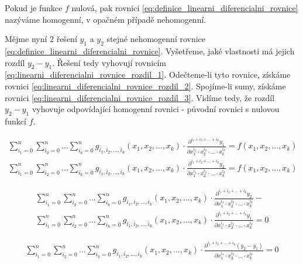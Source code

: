 \documentclass{book}
\begin{document}
Pokud je funkce \(f\) nulová, pak rovnici \eqref{eq:definice_linearni_diferencialni_rovnice} nazýváme homogenní, v opačném případě nehomogenní.

Mějme nyní 2 řešení \(y_1\) a \(y_2\) stejné nehomogenní rovnice \eqref{eq:definice_linearni_diferencialni_rovnice}. Vyšetřeme, jaké vlastnosti má jejich
rozdíl \(y_2 - y_1\). Řešení tedy vyhovují rovnicím \eqref{eq:linearni_diferencialni_rovnice_rozdil_1}. Odečteme-li tyto rovnice, získáme
rovnici \eqref{eq:linearni_diferencialni_rovnice_rozdil_2}. Spojíme-li sumy, získáme rovnici \eqref{eq:linearni_diferencialni_rovnice_rozdil_3}.
Vidíme tedy, že rozdíl \(y_2 - y_1\) vyhovuje odpovídající homogenní rovnici - původní rovnici \label{eq:definice_linearni_diferencialni_rovnice} s nulovou
funkcí \(f\).

\begin{equation}
\label{eq:linearni_diferencialni_rovnice_rozdil_1}
\begin{split}
\sum_{i_1=0}^n \sum_{i_2=0}^n ... \sum_{i_k=0}^n g_{i_1, i_2, ..., i_k} (x_1, x_2, ..., x_k) \cdot \frac{\partial^{i_1 + i_2 + ... + i_k} y_1}{\partial x_1^{i_1} \cdot x_2^{i_2} \cdot ... \cdot x_k^{i_k}} = f(x_1, x_2, ..., x_k) \\
\sum_{i_1=0}^n \sum_{i_2=0}^n ... \sum_{i_k=0}^n g_{i_1, i_2, ..., i_k} (x_1, x_2, ..., x_k) \cdot \frac{\partial^{i_1 + i_2 + ... + i_k} y_2}{\partial x_1^{i_1} \cdot x_2^{i_2} \cdot ... \cdot x_k^{i_k}} = f(x_1, x_2, ..., x_k)
\end{split}
\end{equation}

\begin{equation}
\label{eq:linearni_diferencialni_rovnice_rozdil_2}
\begin{split}
\sum_{i_1=0}^n \sum_{i_2=0}^n ... \sum_{i_k=0}^n g_{i_1, i_2, ..., i_k} (x_1, x_2, ..., x_k) \cdot \frac{\partial^{i_1 + i_2 + ... + i_k} y_2}{\partial x_1^{i_1} \cdot x_2^{i_2} \cdot ... \cdot x_k^{i_k}} - \\
\sum_{i_1=0}^n \sum_{i_2=0}^n ... \sum_{i_k=0}^n g_{i_1, i_2, ..., i_k} (x_1, x_2, ..., x_k) \cdot \frac{\partial^{i_1 + i_2 + ... + i_k} y_1}{\partial x_1^{i_1} \cdot x_2^{i_2} \cdot ... \cdot x_k^{i_k}} = 0
\end{split}
\end{equation}

\begin{equation}
\label{eq:linearni_diferencialni_rovnice_rozdil_3}
\begin{split}
\sum_{i_1=0}^n \sum_{i_2=0}^n ... \sum_{i_k=0}^n g_{i_1, i_2, ..., i_k} (x_1, x_2, ..., x_k) \cdot \frac{\partial^{i_1 + i_2 + ... + i_k} (y_2 - y_1)}{\partial x_1^{i_1} \cdot x_2^{i_2} \cdot ... \cdot x_k^{i_k}} = 0
\end{split}
\end{equation}
\end{document}
